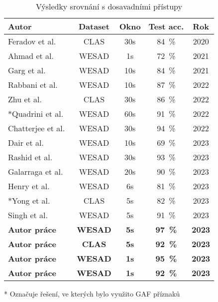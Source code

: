 \begin{table}[h]
    \small
    \centering
    \caption{Výsledky srovnání s dosavadními přístupy}
    \begin{threeparttable}
        \begin{tabular*}{\linewidth}{@{\extracolsep{\fill}} lcccc @{}}
            \toprule
            Autor                                   & Dataset & Okno & Test acc. & Rok  \\ \midrule
            Feradov et al.~\cite{Feradov2020}       & CLAS    & 30s  & 84~\%     & 2020 \\
            Ahmad et al.~\cite{Ahmad2021}           & WESAD   & 1s   & 72~\%     & 2021 \\
            Garg et al.~\cite{Garg2021}             & WESAD   & 10s  & 84~\%     & 2021 \\
            Rabbani et al.~\cite{Rabbani2022}       & WESAD   & 10s  & 87~\%     & 2022 \\
            Zhu et al.~\cite{Zhu2022}               & CLAS    & 30s  & 86~\%     & 2022 \\
            *Quadrini et al.~\cite{Quadrini2022}    & WESAD   & 60s  & 91~\%     & 2022 \\
            Chatterjee et al.~\cite{Chatterjee2022} & WESAD   & 30s  & 94~\%     & 2022 \\
            Dair et al.~\cite{Dair2023}             & WESAD   & 10s  & 69~\%     & 2023 \\
            Rashid et al.~\cite{Rashid2023}         & WESAD   & 30s  & 93~\%     & 2023 \\
            Galarraga et al.~\cite{Galarraga2023}   & WESAD   & 20s  & 90~\%     & 2023 \\
            Henry et al.~\cite{Henry2023}           & WESAD   & 6s   & 81~\%     & 2023 \\
            *Yong et al.~\cite{Yong2023}            & CLAS    & 5s   & 82~\%     & 2023 \\
            Singh et al.~\cite{Singh2023}           & WESAD   & 5s   & 91~\%     & 2023 \\ \midrule
            \textbf{Autor práce}         & \textbf{WESAD}   & \textbf{5s}   & \textbf{97~\%}     & \textbf{2023} \\
            \textbf{Autor práce}         & \textbf{CLAS}    & \textbf{5s}   & \textbf{92~\%}     & \textbf{2023} \\
            \textbf{Autor práce}         & \textbf{WESAD}   & \textbf{1s}   & \textbf{95~\%}     & \textbf{2023} \\
            \textbf{Autor práce}         & \textbf{WESAD}   & \textbf{1s}   & \textbf{92~\%}     & \textbf{2023} \\
            \bottomrule
        \end{tabular*}
        \begin{tablenotes}
            \item [*] Označuje řešení, ve kterých bylo využito \gls{GAF} příznaků
        \end{tablenotes}
    \end{threeparttable}
    \label{tab:state_comparison}
\end{table}

